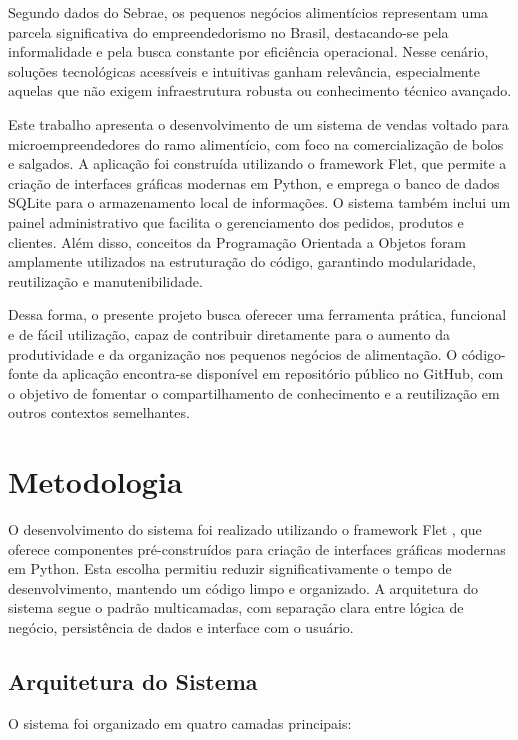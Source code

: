 \documentclass[conference]{IEEEtran}
\begin{document}
Segundo dados do Sebrae, os pequenos negócios alimentícios representam uma parcela significativa do empreendedorismo no Brasil, destacando-se pela informalidade e pela busca constante por eficiência operacional. Nesse cenário, soluções tecnológicas acessíveis e intuitivas ganham relevância, especialmente aquelas que não exigem infraestrutura robusta ou conhecimento técnico avançado.

Este trabalho apresenta o desenvolvimento de um sistema de vendas voltado para microempreendedores do ramo alimentício, com foco na comercialização de bolos e salgados. A aplicação foi construída utilizando o framework Flet, que permite a criação de interfaces gráficas modernas em Python, e emprega o banco de dados SQLite para o armazenamento local de informações. O sistema também inclui um painel administrativo que facilita o gerenciamento dos pedidos, produtos e clientes. Além disso, conceitos da Programação Orientada a Objetos foram amplamente utilizados na estruturação do código, garantindo modularidade, reutilização e manutenibilidade.

Dessa forma, o presente projeto busca oferecer uma ferramenta prática, funcional e de fácil utilização, capaz de contribuir diretamente para o aumento da produtividade e da organização nos pequenos negócios de alimentação. O código-fonte da aplicação encontra-se disponível em repositório público no GitHub, com o objetivo de fomentar o compartilhamento de conhecimento e a reutilização em outros contextos semelhantes.

\section{Metodologia}

O desenvolvimento do sistema foi realizado utilizando o framework Flet \cite{flet}, que oferece componentes pré-construídos para criação de interfaces gráficas modernas em Python. Esta escolha permitiu reduzir significativamente o tempo de desenvolvimento, mantendo um código limpo e organizado. A arquitetura do sistema segue o padrão multicamadas, com separação clara entre lógica de negócio, persistência de dados e interface com o usuário.

\subsection{Arquitetura do Sistema}
O sistema foi organizado em quatro camadas principais:
\end{document}
